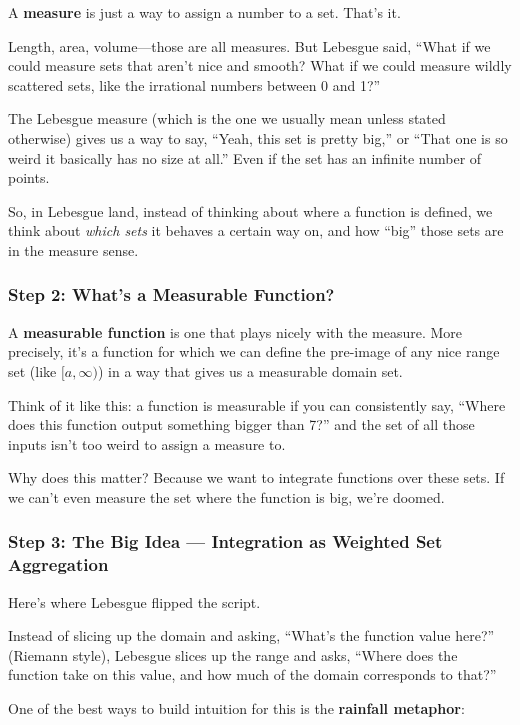A \textbf{measure} is just a way to assign a number to a set. That’s it.

Length, area, volume—those are all measures. But Lebesgue said, “What if we could measure sets that aren’t nice and smooth? What if we could measure wildly scattered sets, like the irrational numbers between 0 and 1?”

The Lebesgue measure (which is the one we usually mean unless stated otherwise) gives us a way to say, “Yeah, this set is pretty big,” or “That one is so weird it basically has no size at all.” Even if the set has an infinite number of points.

So, in Lebesgue land, instead of thinking about where a function is defined, we think about \textit{which sets} it behaves a certain way on, and how “big” those sets are in the measure sense.

\subsubsection{Step 2: What’s a Measurable Function?}

A \textbf{measurable function} is one that plays nicely with the measure. More precisely, it's a function for which we can define the pre-image of any nice range set (like \([a, \infty)\)) in a way that gives us a measurable domain set.

Think of it like this: a function is measurable if you can consistently say, “Where does this function output something bigger than 7?” and the set of all those inputs isn’t too weird to assign a measure to.

Why does this matter? Because we want to integrate functions over these sets. If we can't even measure the set where the function is big, we’re doomed.

\subsubsection{Step 3: The Big Idea — Integration as Weighted Set Aggregation}

Here’s where Lebesgue flipped the script.

Instead of slicing up the domain and asking, “What’s the function value here?” (Riemann style), Lebesgue slices up the range and asks, “Where does the function take on this value, and how much of the domain corresponds to that?”

One of the best ways to build intuition for this is the \textbf{rainfall metaphor}:

